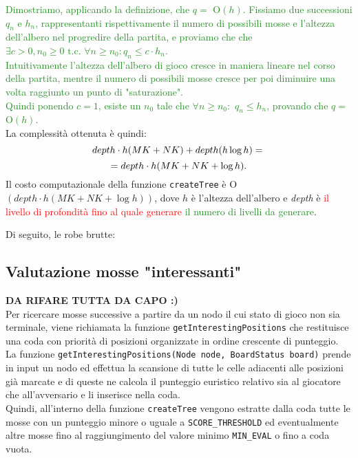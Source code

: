 \documentclass[11pt]{article}
\begin{document}
\textcolor{ForestGreen}{
Dimostriamo, applicando la definizione, che $q =$ O$(h)$. 
Fissiamo due successioni $q_n$ e $h_n$, rappresentanti rispettivamente il numero di possibili mosse e l'altezza dell'albero nel progredire della partita, e proviamo che che $\exists c > 0, n_0 \geq 0 \text{ t.c. } \forall n \geq n_0 : q_n \leq c \cdot h_n$.\\
Intuitivamente l'altezza dell'albero di gioco cresce in maniera lineare nel corso della partita, mentre il numero di possibili mosse cresce per poi diminuire una volta raggiunto un punto di "saturazione".\\
Quindi ponendo $c=1$, esiste un $n_0$ tale che $\forall n \geq n_0:$ $q_n \leq h_n$, provando che $q =$ O$(h)$.
}
\\
La complessità ottenuta è quindi:
\begin{equation*}
depth \cdot h(MK+NK)+depth(h\log h)=\\
\end{equation*}
\begin{equation*}
=depth \cdot h(MK+NK+\log h).\\
\end{equation*}
Il costo computazionale della funzione \texttt{createTree} è O$(depth \cdot h(MK+NK+\log h))$, dove $h$ è l'altezza dell'albero e \textit{depth} è \textcolor{red}{il livello di profondità fino al quale generare} \textcolor{ForestGreen}{il numero di livelli da generare}.



\newpage
Di seguito, le robe brutte:
\newpage

\subsection*{Valutazione mosse "interessanti"}
\textbf{DA RIFARE TUTTA DA CAPO :)}\\
Per ricercare mosse successive a partire da un nodo il cui stato di gioco non sia terminale, viene richiamata la funzione \texttt{getInterestingPositions} che restituisce una coda con priorità di posizioni organizzate in ordine crescente di punteggio.\\
La funzione \texttt{getInterestingPositions(Node node, BoardStatus board)} prende in input un nodo ed effettua la scansione di tutte le celle adiacenti alle posizioni già marcate e di queste ne calcola il punteggio euristico relativo sia al giocatore che all'avversario e li inserisce nella coda.\\
Quindi, all'interno della funzione \texttt{createTree} vengono estratte dalla coda tutte le mosse con un punteggio minore o uguale a \texttt{SCORE\_THRESHOLD} ed eventualmente altre mosse fino al raggiungimento del valore minimo \texttt{MIN\_EVAL} o fino a coda vuota.
\end{document}
